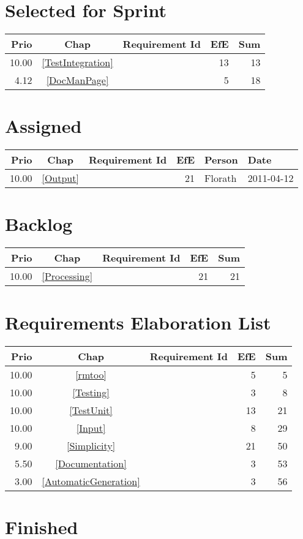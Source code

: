 \section{Selected for Sprint}
\begin{longtable}{|r|c|p{7cm}||r|r|} \hline
\textbf{Prio} & \textbf{Chap} & \textbf{Requirement Id} & \textbf{EfE} & \textbf{Sum} \\ \hline\endhead
10.00 & \ref{TestIntegration} & \nameref{TestIntegration} & 13 & 13 \\ \hline
4.12 & \ref{DocManPage} & \nameref{DocManPage} & 5 & 18 \\ \hline
\end{longtable}\section{Assigned}
\begin{longtable}{|r|c|p{6.5cm}||r|l|l|} \hline
\textbf{Prio} & \textbf{Chap} & \textbf{Requirement Id} & \textbf{EfE} & \textbf{Person} & \textbf{Date} \\ \hline\endhead
10.00 & \ref{Output} & \nameref{Output} & 21 & Florath & 2011-04-12 \\ \hline
\end{longtable}\section{Backlog}
\begin{longtable}{|r|c|p{7cm}||r|r|} \hline
\textbf{Prio} & \textbf{Chap} & \textbf{Requirement Id} & \textbf{EfE} & \textbf{Sum} \\ \hline\endhead
10.00 & \ref{Processing} & \nameref{Processing} & 21 & 21 \\ \hline
\end{longtable}\section{Requirements Elaboration List}
\begin{longtable}{|r|c|p{7cm}||r|r|} \hline
\textbf{Prio} & \textbf{Chap} & \textbf{Requirement Id} & \textbf{EfE} & \textbf{Sum} \\ \hline\endhead
10.00 & \ref{rmtoo} & \nameref{rmtoo} & 5 & 5 \\ \hline
10.00 & \ref{Testing} & \nameref{Testing} & 3 & 8 \\ \hline
10.00 & \ref{TestUnit} & \nameref{TestUnit} & 13 & 21 \\ \hline
10.00 & \ref{Input} & \nameref{Input} & 8 & 29 \\ \hline
9.00 & \ref{Simplicity} & \nameref{Simplicity} & 21 & 50 \\ \hline
5.50 & \ref{Documentation} & \nameref{Documentation} & 3 & 53 \\ \hline
3.00 & \ref{AutomaticGeneration} & \nameref{AutomaticGeneration} & 3 & 56 \\ \hline
\end{longtable}\section{Finished}
